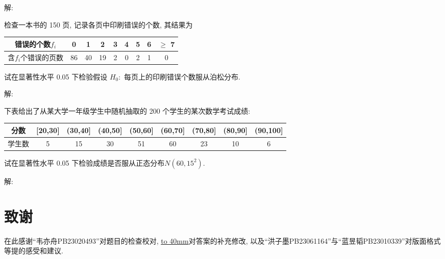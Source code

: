 \documentclass[standard]{ExBook}
\begin{document}
\begin{qitems}
    \begin{bbox}
解: 
    \end{bbox}

\vspace{-5em}

    \begin{bbox}
    \begin{shaded}
        \qitem
检查一本书的 150 页, 记录各页中印刷错误的个数, 其结果为
\begin{center}
\setlength{\tabcolsep}{17pt}
\begin{tabular}{c|cccccccc}
\hline
错误的个数$f_i$ & 0 & 1 & 2 & 3 & 4 & 5 & 6 & $\geq$ 7 \\
\hline
含$f_i$个错误的页数 & 86 & 40 & 19 & 2 & 0 & 2 & 1 & 0 \\
\hline
\end{tabular}
\end{center}
试在显著性水平 0.05 下检验假设 $H_0 : $ 每页上的印刷错误个数服从泊松分布.
    \end{shaded}
    \end{bbox}

\vspace{-5em}

    \begin{bbox}
解: 
    \end{bbox}

\vspace{-5em}

    \begin{bbox}
    \begin{shaded}
        \qitem
下表给出了从某大学一年级学生中随机抽取的 200 个学生的某次数学考试成绩:
\begin{center}
\setlength{\tabcolsep}{9pt}
\begin{tabular}{c|cccccccc}
\hline
分数 & [20,30] & (30,40] & (40,50] & (50,60] & (60,70] & (70,80] & (80,90] & (90,100] \\
\hline
学生数 & 5 & 15 & 30 & 51 & 60 & 23 & 10 & 6 \\
\hline
\end{tabular}
\end{center}
试在显著性水平 0.05 下检验成绩是否服从正态分布$N(60,15^2)$.
    \end{shaded}
    \end{bbox}

\vspace{-5em}

    \begin{bbox}
解: 
    \end{bbox}
\end{qitems}


\section*{致谢}

在此感谢``韦亦舟PB23020493''对题目的检查校对, \underline{\hbox to 40mm{}}对答案的补充修改, 以及``洪子墨PB23061164''与``蓝昱韬PB23010339''对版面格式等提的感受和建议.
\end{document}
